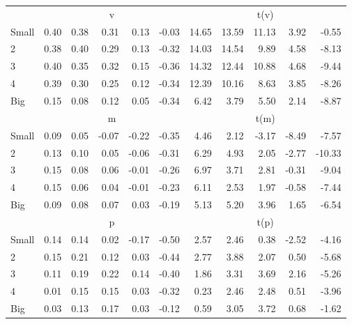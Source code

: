 \begin{table}[!ht]
\begin{tabular}{lrrrrrrrrrr}
  
     & \multicolumn{5}{c}{v} & \multicolumn{5}{c}{t(v)}   \\
     \cmidrule(r){2-6} \cmidrule(r){7-11} 
    Small  & 0.40  & 0.38  & 0.31  & 0.13  & -0.03  & 14.65  & 13.59  & 11.13  & 3.92  & -0.55   \\
    2  & 0.38  & 0.40  & 0.29  & 0.13  & -0.32  & 14.03  & 14.54  & 9.89  & 4.58  & -8.13   \\
    3  & 0.40  & 0.35  & 0.32  & 0.15  & -0.36  & 14.32  & 12.44  & 10.88  & 4.68  & -9.44   \\
    4  & 0.39  & 0.30  & 0.25  & 0.12  & -0.34  & 12.39  & 10.16  & 8.63  & 3.85  & -8.26   \\
    Big  & 0.15  & 0.08  & 0.12  & 0.05  & -0.34  & 6.42  & 3.79  & 5.50  & 2.14  & -8.87   \\
    
  
     & \multicolumn{5}{c}{m} & \multicolumn{5}{c}{t(m)}   \\
     \cmidrule(r){2-6} \cmidrule(r){7-11} 
    Small  & 0.09  & 0.05  & -0.07  & -0.22  & -0.35  & 4.46  & 2.12  & -3.17  & -8.49  & -7.57   \\
    2  & 0.13  & 0.10  & 0.05  & -0.06  & -0.31  & 6.29  & 4.93  & 2.05  & -2.77  & -10.33   \\
    3  & 0.15  & 0.08  & 0.06  & -0.01  & -0.26  & 6.97  & 3.71  & 2.81  & -0.31  & -9.04   \\
    4  & 0.15  & 0.06  & 0.04  & -0.01  & -0.23  & 6.11  & 2.53  & 1.97  & -0.58  & -7.44   \\
    Big  & 0.09  & 0.08  & 0.07  & 0.03  & -0.19  & 5.13  & 5.20  & 3.96  & 1.65  & -6.54   \\
    
  
     & \multicolumn{5}{c}{p} & \multicolumn{5}{c}{t(p)}   \\
     \cmidrule(r){2-6} \cmidrule(r){7-11} 
    Small  & 0.14  & 0.14  & 0.02  & -0.17  & -0.50  & 2.57  & 2.46  & 0.38  & -2.52  & -4.16   \\
    2  & 0.15  & 0.21  & 0.12  & 0.03  & -0.44  & 2.77  & 3.88  & 2.07  & 0.50  & -5.68   \\
    3  & 0.11  & 0.19  & 0.22  & 0.14  & -0.40  & 1.86  & 3.31  & 3.69  & 2.16  & -5.26   \\
    4  & 0.01  & 0.15  & 0.15  & 0.03  & -0.32  & 0.23  & 2.46  & 2.48  & 0.51  & -3.96   \\
    Big  & 0.03  & 0.13  & 0.17  & 0.03  & -0.12  & 0.59  & 3.05  & 3.72  & 0.68  & -1.62   \\
    
  
  \bottomrule
\end{tabular}
\label{tbl:25_Size_RVar_B16}
\end{table}